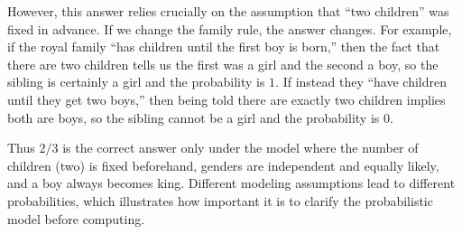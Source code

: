 However, this answer relies crucially on the assumption that “two children” was fixed in advance. If we change the family rule, the answer changes. For example, if the royal family “has children until the first boy is born,” then the fact that there are two children tells us the first was a girl and the second a boy, so the sibling is certainly a girl and the probability is \(1\). If instead they “have children until they get two boys,” then being told there are exactly two children implies both are boys, so the sibling cannot be a girl and the probability is \(0\).

Thus \(2/3\) is the correct answer only under the model where the number of children (two) is fixed beforehand, genders are independent and equally likely, and a boy always becomes king. Different modeling assumptions lead to different probabilities, which illustrates how important it is to clarify the probabilistic model before computing.